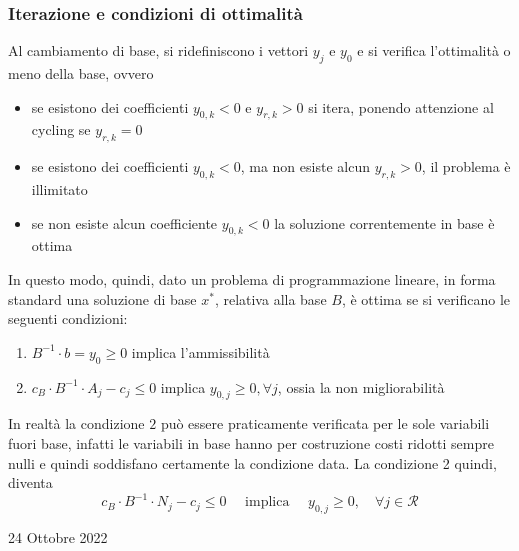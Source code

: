 \documentclass[a4paper]{extarticle}
\begin{document}
\subsubsection{Iterazione e condizioni di ottimalità}
Al cambiamento di base, si ridefiniscono i vettori $y_j$ e $y_0$ e si verifica l'ottimalità o meno della base, ovvero
\begin{itemize}
    \item se esistono dei coefficienti $y_{0,k} < 0$ e $y_{r,k} > 0$ si itera, ponendo attenzione al cycling se $y_{r,k} = 0$
    \item se esistono dei coefficienti $y_{0,k} < 0$, ma non esiste alcun $y_{r,k} > 0$, il problema è illimitato
    \item se non esiste alcun coefficiente $y_{0,k} < 0$ la soluzione correntemente in base è ottima
\end{itemize}
In questo modo, quindi, dato un problema di programmazione lineare, in forma standard una soluzione di base $x^*$, relativa alla base $B$, è ottima se si verificano le seguenti condizioni:
\begin{enumerate}
    \item $B^{-1} \cdot b = y_0 \geq 0$ implica l'ammissibilità
    \item $c_B \cdot B^{-1} \cdot A_j - c_j \leq 0$ implica $y_{0,j} \geq 0, \forall j$, ossia la non migliorabilità
\end{enumerate}
In realtà la condizione $2$ può essere praticamente verificata per le sole variabili fuori base, infatti le variabili in base hanno per costruzione costi ridotti sempre nulli e quindi soddisfano certamente la condizione data. La condizione 2 quindi, diventa
\[c_B \cdot B^{-1} \cdot N_j - c_j \leq 0 \hspace{1em} \text{ implica } \hspace{1em} y_{0,j} \geq 0, \hspace{1em} \forall j \in \mathcal{R}\]

\newpage
\begin{center}
    24 Ottobre 2022
\end{center}
\end{document}
